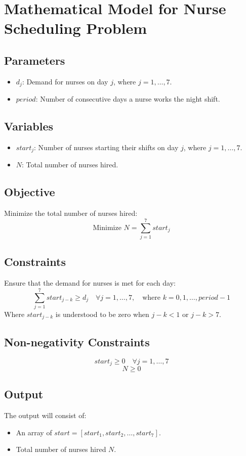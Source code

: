 \documentclass{article}
\begin{document}
\section*{Mathematical Model for Nurse Scheduling Problem}

\subsection*{Parameters}
\begin{itemize}
    \item $d_j$: Demand for nurses on day $j$, where $j = 1, \ldots, 7$.
    \item $period$: Number of consecutive days a nurse works the night shift.
\end{itemize}

\subsection*{Variables}
\begin{itemize}
    \item $start_j$: Number of nurses starting their shifts on day $j$, where $j = 1, \ldots, 7$.
    \item $N$: Total number of nurses hired.
\end{itemize}

\subsection*{Objective}
Minimize the total number of nurses hired:
\[
\text{Minimize } N = \sum_{j=1}^{7} start_j
\]

\subsection*{Constraints}
Ensure that the demand for nurses is met for each day:
\[
\sum_{j=1}^{7} start_{j - k} \geq d_j \quad \forall j = 1, \ldots, 7, \quad \text{where } k = 0, 1, \ldots, period - 1
\]
Where $start_{j - k}$ is understood to be zero when $j - k < 1$ or $j - k > 7$.

\subsection*{Non-negativity Constraints}
\[
start_j \geq 0 \quad \forall j = 1, \ldots, 7
\]
\[
N \geq 0
\]

\subsection*{Output}
The output will consist of:
\begin{itemize}
    \item An array of $start = [start_1, start_2, \ldots, start_7]$.
    \item Total number of nurses hired $N$.
\end{itemize}
\end{document}
